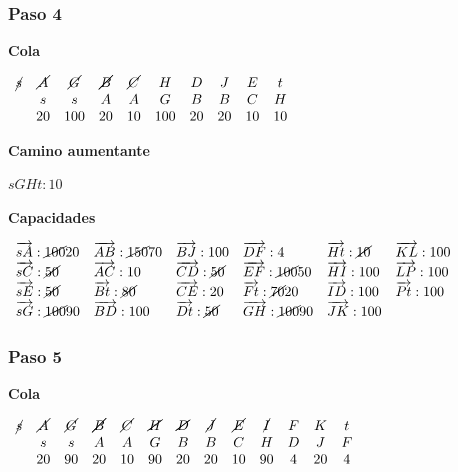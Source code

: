 \documentclass[10pt,a4paper]{article}
\begin{document}
\subsubsection*{Paso 4}

\textbf{Cola}

$\begin{array}{cccccccccc} \cancel{s} & \cancel{A} & \cancel{G} & \cancel{B} & \cancel{C} & H &D &J & E & t\\ & s & s & A & A &G & B &B & C &H\\ & 20 & 100 & 20 & 10 &100 &20 &20 & 10 & 10 \end{array}$

\textbf{Camino aumentante}

\textbf{$sGHt:10$}

\textbf{Capacidades}

$\begin{array}{llllll} \overrightarrow{sA}: \cancel{100}20& \overrightarrow{AB}: \cancel{150} 70&\overrightarrow{BJ}: 100&\overrightarrow{DF}: 4&\overrightarrow{Ht}: \cancel{10}&\overrightarrow{KL}: 100\\ \overrightarrow{sC}: \cancel{50}& \overrightarrow{AC}: 10&\overrightarrow{CD}: \cancel{50}&\overrightarrow{EF}: \cancel{100}50&\overrightarrow{HI}: 100&\overrightarrow{LP}: 100\\ \overrightarrow{sE}: \cancel{50}& \overrightarrow{Bt}: \cancel{80}&\overrightarrow{CE}: 20&\overrightarrow{Ft}: \cancel{70}20&\overrightarrow{ID}: 100&\overrightarrow{Pt}: 100\\ \overrightarrow{sG}: \cancel{100}90& \overrightarrow{BD}: 100&\overrightarrow{Dt}: \cancel{50}&\overrightarrow{GH}: \cancel{100}90&\overrightarrow{JK}: 100&\\ \end{array}$

\subsubsection*{Paso 5}

\textbf{Cola}

$\begin{array}{ccccccccccccc} \cancel{s} & \cancel{A} & \cancel{G} &\cancel{B} & \cancel{C} & \cancel{H} & \cancel{D} & \cancel{J} &\cancel{E} & \cancel{I} & F & K & t\\ & s & s & A &A & G & B &B & C &H & D &J &F\\ & 20 & 90 & 20 & 10&90 &20 &20 &10 & 90 & 4 & 20 & 4 \end{array}$
\end{document}
